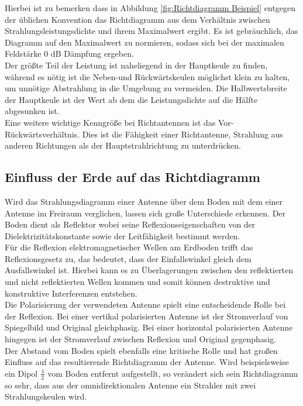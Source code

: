 Hierbei ist zu bemerken dass in Abbildung \ref{fig:Richtdiagramm Beispiel} entgegen der üblichen Konvention das Richtdiagramm aus dem Verhältnis zwischen Strahlungsleistungsdichte und ihrem Maximalwert ergibt. Es ist gebräuchlich, das Diagramm auf den Maximalwert zu normieren, sodass sich bei der maximalen Feldstärke 0 dB Dämpfung ergeben.\\

Der größte Teil der Leistung ist naheliegend in der Hauptkeule zu finden, während es nötig ist die Neben-und Rückwärtskeulen möglichst klein zu halten, um unnötige Abstrahlung in die Umgebung zu vermeiden. Die Halbwertsbreite der Hauptkeule ist der Wert ab dem die Leistungsdichte auf die Hälfte abgesunken ist.\\

Eine weitere wichtige Kenngröße bei Richtantennen ist das Vor-Rückwärtsverhältnis. Dies ist die Fähigkeit einer Richtantenne, Strahlung aus anderen Richtungen als der Hauptstrahlrichtung zu unterdrücken.

\subsection{Einfluss der Erde auf das Richtdiagramm}
Wird das Strahlungsdiagramm einer Antenne über dem Boden mit dem einer Antenne im Freiraum verglichen, lassen sich große Unterschiede erkennen. Der Boden dient als Reflektor wobei seine Reflexionseigenschaften von der Dielektrizitätskonstante sowie der Leitfähigkeit bestimmt werden.\\

Für die Reflexion elektromagnetischer Wellen am Erdboden trifft das Reflexionsgesetz zu, das bedeutet, dass der Einfallswinkel gleich dem Ausfallswinkel ist. Hierbei kann es zu Überlagerungen zwischen den reflektierten und nicht reflektierten Wellen kommen und somit können destruktive und konstruktive Interferenzen entstehen.\\

Die Polarisierung der verwendeten Antenne spielt eine entscheidende Rolle bei der Reflexion. Bei einer vertikal polarisierten Antenne ist der Stromverlauf von Spiegelbild und Original gleichphasig. Bei einer horizontal polarisierten Antenne hingegen ist der Stromverlauf zwischen Reflexion und Original gegenphasig.\\

Der Abstand vom Boden spielt ebenfalls eine kritische Rolle und hat großen Einfluss auf das resultierende Richtdiagramm der Antenne. Wird beispielsweise ein Dipol $\frac{\lambda}{2}$ vom Boden entfernt aufgestellt, so verändert sich sein Richtdiagramm so sehr, dass aus der omnidirektionalen Antenne ein Strahler mit zwei Strahlungskeulen wird. 


